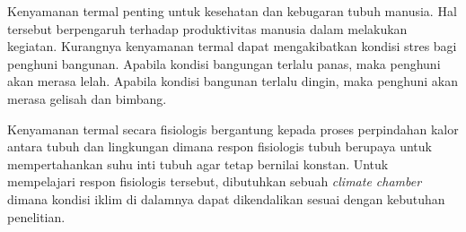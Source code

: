 Kenyamanan termal penting untuk kesehatan dan kebugaran tubuh manusia. Hal tersebut berpengaruh terhadap produktivitas manusia dalam melakukan kegiatan. Kurangnya kenyamanan termal dapat mengakibatkan kondisi stres bagi penghuni bangunan. Apabila kondisi bangungan terlalu panas, maka penghuni akan merasa lelah. Apabila kondisi bangunan terlalu dingin, maka penghuni akan merasa gelisah dan bimbang.

Kenyamanan termal secara fisiologis bergantung kepada proses perpindahan kalor antara tubuh dan lingkungan dimana respon fisiologis tubuh berupaya untuk mempertahankan suhu inti tubuh agar tetap bernilai konstan. Untuk mempelajari respon fisiologis tersebut, dibutuhkan sebuah \textit{climate chamber} dimana kondisi iklim di dalamnya dapat dikendalikan sesuai dengan kebutuhan penelitian.



